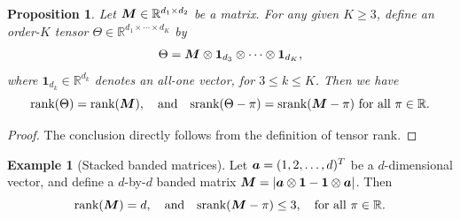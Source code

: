 \documentclass[11pt]{article}
\theoremstyle{plain}
\newtheorem{prop}{Proposition}
\theoremstyle{definition}
\newtheorem{example}{Example}
\def\srank{\textup{srank}}
\def\rank{\textup{rank}}
\begin{document}
\begin{prop} Let $\bm M\in\mathbb{R}^{d_1\times d_2}$ be a matrix. For any given $K\geq 3$, define an order-$K$ tensor $\Theta\in\mathbb{R}^{d_1\times \cdots \times d_K}$ by
\[
\Theta=\bm M\otimes \mathbf{1}_{d_3}\otimes \cdots \otimes \mathbf{1}_{d_K},
\] 
where $\mathbf{1}_{d_k}\in\mathbb{R}^{d_k}$ denotes an all-one vector, for $3\leq k\leq K$. Then we have
\[
\rank(\Theta)=\rank(\mM),\quad \text{and}\quad \srank(\Theta-\pi)=\srank(\mM-\pi) \ \text{for all $\pi\in\mathbb{R}$}.
\] 
\end{prop}
\begin{proof}
The conclusion directly follows from the definition of tensor rank. 
\end{proof}

\begin{example}[Stacked banded matrices]\label{example:banded} Let $\bm{a}=(1,2,\ldots,d)^T$ be a $d$-dimensional vector, and define a $d$-by-$d$ banded matrix $\bm M=|\bm{a}\otimes \mathbf{1}-\mathbf{1}\otimes \bm{a}|$. Then
\[
\rank(\mM)=d,\quad \text{and}\quad \srank(\mM-\pi)\leq 3, \quad \text{for all }\pi\in \mathbb{R}.
\]
\end{example}
\end{document}

